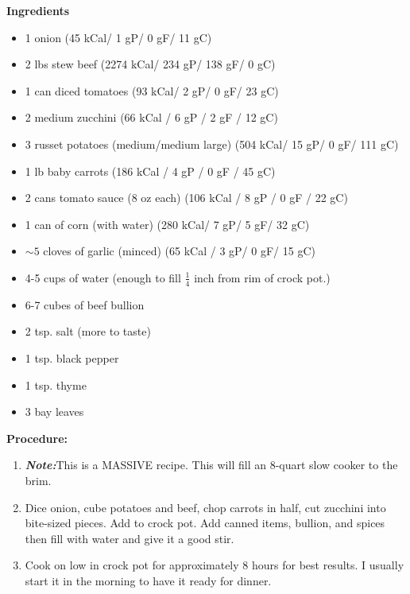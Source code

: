 \documentclass{report}
\begin{document}


\bigskip

\bigskip

\begin{multicols}{2}
\textbf{Ingredients}
\begin{itemize}
\item 1 onion \quad (45 kCal/ 1 gP/ 0 gF/ 11 gC)
\item 2 lbs stew beef \newline(2274 kCal/ 234 gP/  138 gF/ 0 gC)
\item 1 can diced tomatoes \quad (93 kCal/ 2 gP/ 0 gF/ 23 gC)
\item 2 medium zucchini \quad (66 kCal / 6 gP / 2 gF / 12 gC)
\item 3 russet potatoes (medium/medium large) \quad (504 kCal/ 15 gP/ 0 gF/ 111 gC)
\item 1 lb baby carrots \quad (186 kCal / 4 gP / 0 gF / 45 gC)
\item 2 cans tomato sauce (8 oz each) \quad (106 kCal / 8 gP / 0 gF / 22 gC)
\item 1 can of corn (with water) \quad (280 kCal/ 7 gP/ 5 gF/ 32 gC)
\item $\sim 5$ cloves of garlic (minced) (65 kCal / 3 gP/ 0 gF/ 15 gC) 
\item 4-5 cups of water (enough to fill $\frac{1}{4}$ inch from rim of crock pot.)

\item 6-7 cubes of beef bullion 
\item 2 tsp. salt (more to taste) 
\item 1 tsp. black pepper
\item 1 tsp. thyme
\item 3 bay leaves 


\end{itemize}


\columnbreak
\textbf{Procedure:}
\medskip


\begin{enumerate}
\item \textbf{\textit{Note:}}This is a MASSIVE recipe. This will fill an 8-quart slow cooker to the brim. 
\item Dice onion, cube potatoes and beef, chop carrots in half, cut zucchini into bite-sized pieces. Add to crock pot. Add canned items, bullion, and spices then fill with water and give it a good stir. 


\medskip
\item Cook on low in crock pot for approximately 8 hours for best results. I usually start it in the morning to have it ready for dinner. 
  

\end{enumerate}
\end{multicols}
\end{document}
